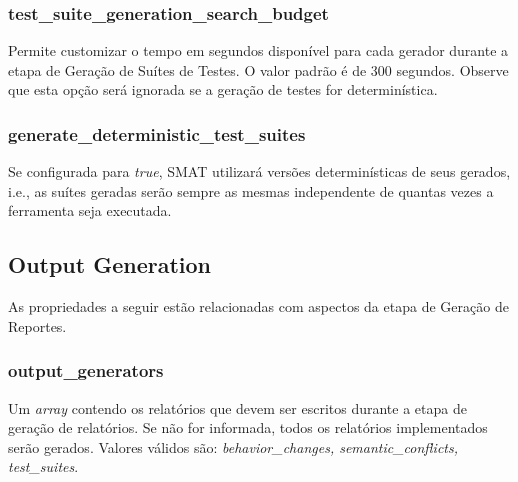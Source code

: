 \documentclass[12pt]{article}
\begin{document}
\subsubsection{test\_suite\_generation\_search\_budget}
Permite customizar o tempo em segundos disponível para cada gerador durante a etapa de Geração de Suítes de Testes. O valor padrão é de 300 segundos. Observe que esta opção será ignorada se a geração de testes for determinística.

\subsubsection{generate\_deterministic\_test\_suites}
Se configurada para \textit{true}, SMAT utilizará versões determinísticas de seus gerados, i.e., as suítes geradas serão sempre as mesmas independente de quantas vezes a ferramenta seja executada.

\subsection{Output Generation}
As propriedades a seguir estão relacionadas com aspectos da etapa de Geração de Reportes.

\subsubsection{output\_generators}
Um \textit{array} contendo os relatórios que devem ser escritos durante a etapa de geração de relatórios. Se não for informada, todos os relatórios implementados serão gerados. Valores válidos são: \textit{behavior\_changes, semantic\_conflicts, test\_suites}.
\end{document}
